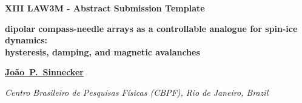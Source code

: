 \documentclass[12pt,a4paper]{article}
\begin{document}
\begin{center}
{\bfseries\fontsize{14}{16}\selectfont XIII LAW3M - Abstract Submission Template}\par
\vspace{6pt}
{\bfseries\fontsize{14}{16}\selectfont
dipolar compass-needle arrays as a controllable analogue for spin-ice dynamics:\\
hysteresis, damping, and magnetic avalanches}\par
\vspace{10pt}
{\bfseries\fontsize{12}{14}\selectfont \uline{Jo\~ao~P.~Sinnecker}}\par
\vspace{6pt}
{\itshape\fontsize{12}{14}\selectfont Centro Brasileiro de Pesquisas F\'isicas (CBPF), Rio de Janeiro, Brazil}\par
\end{center}
\vspace{10pt}
\end{document}
